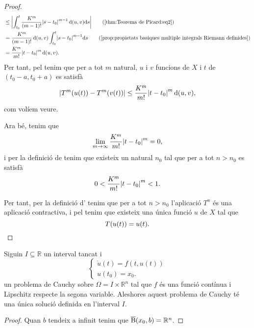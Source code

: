\documentclass[../Apunts.tex]{subfiles}
\begin{document}
\begin{theorem}
\begin{proof}
\begin{align*}
				&\leq\abs{\int_{t_{0}}^{t}\frac{K^{m}}{(m-1)!}\abs{s-t_{0}}^{m-1}\distancia(u,v)\diff s}\tag{\ref{thm:Teorema de Picard:eq2}}\\
				&=\frac{K^{m}}{(m-1)!}\distancia(u,v)\int_{t_{0}}^{t}\abs{s-t_{0}}^{m-1}\diff s\tag{\ref{prop:propietats basiques multiple integrals Riemann definides}}\\
				&=\frac{K^{m}}{m!}\abs{t-t_{0}}^{m}\distancia(u,v).%
			\end{align*}
			Per tant, pel  tenim que per a tot \(m\) natural, \(u\) i \(v\) funcions de \(X\) i \(t\) de \((t_{0}-a,t_{0}+a)\) es satisfà
			\[\norm{T^{m}(u(t))-T^{m}(v(t))}\leq\frac{K^{m}}{m!}\abs{t-t_{0}}^{m}\distancia(u,v),\]
			com volíem veure.
			
			Ara bé, tenim que
			\[\lim_{m\to\infty}\frac{K^{m}}{m!}\abs{t-t_{0}}^{m}=0,\]%
			i per la definició de  tenim que existeix un natural \(n_{0}\) tal que per a tot \(n>n_{0}\) es satisfà
			\[0<{\frac{K^{m}}{m!}\abs{t-t_{0}}^{m}}<1.\]
			
			Per tant, per la definició d' tenim que per a tot \(n>n_{0}\) l'aplicació \(T^{n}\) és una aplicació contractiva, i pel \corollari{}  tenim que existeix una única funció \(u\) de \(X\) tal que
			\[T(u(t))=u(t).\qedhere\]
		\end{proof}
	\end{theorem}
	\begin{corollary}
		\label{cor:Teorema de Picard}
		Siguin \(I\subseteq\mathbb{R}\) un interval tancat i
		\[\begin{cases}
			\displaystyle \dot{u}(t)=f(t,u(t)) \\
			\displaystyle u(t_{0})=x_{0}.
		\end{cases}\]
		un problema de Cauchy sobre \(\Omega=I\times\mathbb{R}^{n}\) tal que \(f\) és una funció contínua i Lipschitz respecte la segona variable. Aleshores aquest problema de Cauchy té una única solució definida en l'interval \(I\).
		\begin{proof}
			Quan \(b\) tendeix a infinit tenim que \(\overline{\operatorname{B}}(x_{0},b)=\mathbb{R}^{n}\).
		\end{proof}
	\end{corollary}
\end{document}
